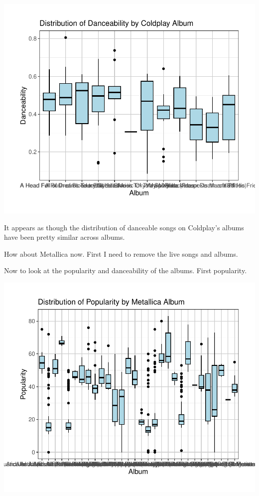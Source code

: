 \documentclass[11pt,preprint, authoryear]{elsarticle}
\numberwithin{equation}{section}
\numberwithin{figure}{section}
\numberwithin{table}{section}
\begin{document}
\includegraphics{Question_3_files/figure-latex/unnamed-chunk-8-1.pdf}

It appears as though the distribution of danceable songs on Coldplay's
albums have been pretty similar across albums.

How about Metallica now. First I need to remove the live songs and
albums.

Now to look at the popularity and danceability of the albums. First
popularity.

\includegraphics{Question_3_files/figure-latex/unnamed-chunk-10-1.pdf}
\end{document}
